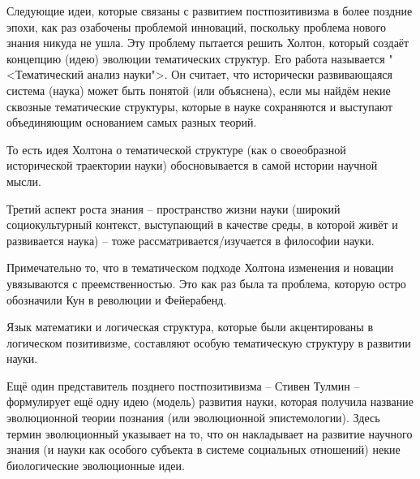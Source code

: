 \documentclass[main.tex]{subfiles}
\begin{document}


Следующие идеи, которые связаны с развитием постпозитивизма в более поздние эпохи, как раз озабочены проблемой инноваций, поскольку проблема нового знания никуда не ушла.
Эту проблему пытается решить Холтон, который создаёт концепцию (идею) эволюции тематических структур.
Его работа называется "<Тематический анализ науки">.
Он считает, что исторически развивающаяся система (наука) может быть понятой (или объяснена), если мы найдём некие сквозные тематические структуры, которые в науке сохраняются и выступают объединяющим основанием самых разных теорий.

То есть идея Холтона о тематической структуре (как о своеобразной исторической траектории науки) обосновывается в самой истории научной мысли.



Третий аспект роста знания -- пространство жизни науки (широкий социокультурный контекст, выступающий в качестве среды, в которой живёт и развивается наука) -- тоже рассматривается/изучается в философии науки.


Примечательно то, что в тематическом подходе Холтона изменения и новации увязываются с преемственностью.
Это как раз была та проблема, которую остро обозначили Кун в революции и Фейерабенд.

Язык математики и логическая структура, которые были акцентированы в логическом позитивизме, составляют особую тематическую структуру в развитии науки.



Ещё один представитель позднего постпозитивизма -- Стивен Тулмин -- формулирует ещё одну идею (модель) развития науки, которая получила название эволюционной теории познания (или эволюционной эпистемологии).
Здесь термин эволюционный указывает на то, что он накладывает на развитие научного знания (и науки как особого субъекта в системе социальных отношений) некие биологические эволюционные идеи.

\end{document}
